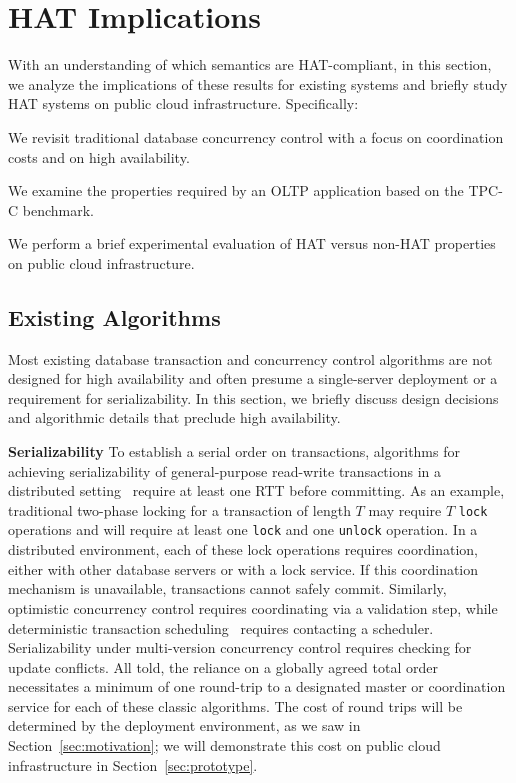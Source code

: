 
\section{HAT Implications}
\label{sec:evaluation}

With an understanding of which semantics are HAT-compliant, in this
section, we analyze the implications of these results for existing
systems and briefly study HAT systems on public cloud
infrastructure. Specifically:

\begin{myenumerate}\vspace{-.5em}
\item We revisit traditional database concurrency control with a focus
  on coordination costs and on high availability.
\item We examine the properties required by an OLTP application based
  on the TPC-C benchmark.
\item We perform a brief experimental evaluation of HAT versus non-HAT
  properties on public cloud infrastructure.
\end{myenumerate}

\subsection{Existing Algorithms}
\label{sec:eval-existing}

Most existing database transaction and concurrency control algorithms
are not designed for high availability and often presume a
single-server deployment or a requirement for serializability. In this
section, we briefly discuss design decisions and algorithmic details
that preclude high availability.

\vspace{.5em}\noindent\textbf{Serializability} To establish a serial
order on transactions, algorithms for achieving serializability of
general-purpose read-write transactions in a distributed
setting~\cite{bernstein-book, davidson-survey}
require at least one RTT before committing. As an
example, traditional two-phase locking for a transaction of length $T$
may require $T$ \texttt{lock} operations and will require at least one
\texttt{lock} and one \texttt{unlock} operation.  In a distributed
environment, each of these lock operations requires coordination,
either with other database servers or with a lock service. If this
coordination mechanism is unavailable, transactions cannot safely
commit. Similarly, optimistic concurrency control requires
coordinating via a validation step, while deterministic transaction
scheduling~\cite{deterministic-scheduling} requires contacting a
scheduler. Serializability under multi-version concurrency control
requires checking for update conflicts. All told, the reliance on a
globally agreed total order necessitates a minimum of one round-trip
to a designated master or coordination service for each of these
classic algorithms.  The cost of round trips will be determined by the
deployment environment, as we saw in Section~\ref{sec:motivation}; we
will demonstrate this cost on public cloud infrastructure in
Section~\ref{sec:prototype}.

